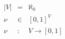 \documentclass{standalone}
\begin{document}
$
\begin{array}{rcl}
\left|V\right| & =   & \aleph_0^{}                   \\
\nu            & \in & \left[0,1\right]_{}^V          \\
\nu            & :   & V\rightarrow{}\left[0,1\right] \\
\end{array}
$
\end{document}
